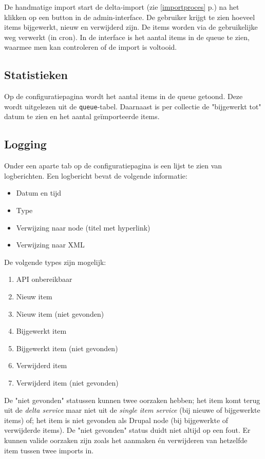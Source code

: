 \documentclass[12pt]{article}
\newcommand{\seeone}[1]{ (zie \ref{#1} p.\pageref{#1})}
\begin{document}
De handmatige import start de delta-import\seeone{importproces} na het klikken op een button in de admin-interface. De gebruiker krijgt te zien hoeveel items bijgewerkt, nieuw en verwijderd zijn. De items worden via de gebruikelijke weg verwerkt (in cron). In de interface is het aantal items in de queue te zien, waarmee men kan controleren of de import is voltooid.

\subsection{Statistieken}

Op de configuratiepagina wordt het aantal items in de queue getoond. Deze wordt uitgelezen uit de \texttt{queue}-tabel. Daarnaast is per collectie de "bijgewerkt tot" datum te zien en het aantal ge\"{i}mporteerde items.

\clearpage
\subsection{Logging}\label{logging}

Onder een aparte tab op de configuratiepagina is een lijst te zien van logberichten. Een logbericht bevat de volgende informatie:
\begin{itemize}
\item Datum en tijd
\item Type
\item Verwijzing naar node (titel met hyperlink)
\item Verwijzing naar XML
\end{itemize}

De volgende types zijn mogelijk:
\begin{enumerate}\label{logtypes}
\item API onbereikbaar
\item Nieuw item
\item Nieuw item (niet gevonden)
\item Bijgewerkt item
\item Bijgewerkt item (niet gevonden)
\item Verwijderd item
\item Verwijderd item (niet gevonden)
\end{enumerate}

De "niet gevonden" statussen kunnen twee oorzaken hebben; het item komt terug uit de \emph{delta service} maar niet uit de \emph{single item service} (bij nieuwe of bijgewerkte items) of; het item is niet gevonden als Drupal node (bij bijgewerkte of verwijderde items). De "niet gevonden" status duidt niet altijd op een fout. Er kunnen valide oorzaken zijn zoals het aanmaken \'{e}n verwijderen van hetzelfde item tussen twee imports in.
\end{document}

